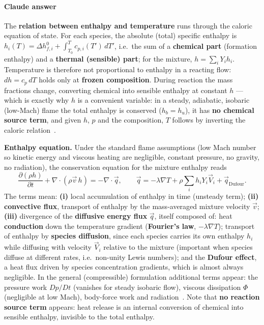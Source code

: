 {\color{istblue}
\paragraph{Claude answer}
The \textbf{relation between enthalpy and temperature} runs through the caloric equation of state. For each species, the absolute (total) specific enthalpy is $h_i(T) = \Delta h_{f,i}^0 + \int_{T_0}^{T} c_{p,i}(T')\,dT'$, i.e.\ the sum of a \textbf{chemical part} (formation enthalpy) and a \textbf{thermal (sensible) part}; for the mixture, $h = \sum_i Y_i h_i$. Temperature is therefore not proportional to enthalpy in a reacting flow: $dh = c_p\,dT$ holds only at \textbf{frozen composition}. During reaction the mass fractions change, converting chemical into sensible enthalpy at constant $h$ --- which is exactly why $h$ is a convenient variable: in a steady, adiabatic, isobaric (low-Mach) flame the total enthalpy is conserved ($h_b = h_u$), it has \textbf{no chemical source term}, and given $h$, $p$ and the composition, $T$ follows by inverting the caloric relation~\cite{lecture8,maas_combustion_lecture}.

\textbf{Enthalpy equation.} Under the standard flame assumptions (low Mach number so kinetic energy and viscous heating are negligible, constant pressure, no gravity, no radiation), the conservation equation for the mixture enthalpy reads~\cite{kuo2005conservation,lecture8}
\begin{equation*}
\frac{\partial (\rho h)}{\partial t} + \nabla \cdot (\rho \vec{v}\, h) = -\nabla \cdot \vec{q}, \qquad
\vec{q} = -\lambda \nabla T + \rho \sum_i h_i Y_i \vec{V}_i + \vec{q}_{\mathrm{Dufour}}.
\end{equation*}
The terms mean: \textbf{(i)} local accumulation of enthalpy in time (unsteady term); \textbf{(ii)} \textbf{convective flux}, transport of enthalpy by the mass-averaged mixture velocity $\vec{v}$; \textbf{(iii)} divergence of the \textbf{diffusive energy flux} $\vec{q}$, itself composed of: heat \textbf{conduction} down the temperature gradient (\textbf{Fourier's law}, $-\lambda \nabla T$); transport of enthalpy by \textbf{species diffusion}, since each species carries its own enthalpy $h_i$ while diffusing with velocity $\vec{V}_i$ relative to the mixture (important when species diffuse at different rates, i.e.\ non-unity Lewis numbers); and the \textbf{Dufour effect}, a heat flux driven by species concentration gradients, which is almost always negligible. In the general (compressible) formulation additional terms appear: the pressure work $Dp/Dt$ (vanishes for steady isobaric flow), viscous dissipation $\Phi$ (negligible at low Mach), body-force work and radiation~\cite{warnatz2006combustion,kuo2005conservation}. Note that \textbf{no reaction source term} appears: heat release is an internal conversion of chemical into sensible enthalpy, invisible to the total enthalpy.

}
